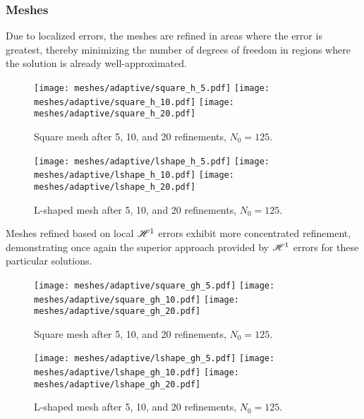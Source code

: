 \newpage
\subsubsection{Meshes}

Due to localized errors, the meshes are refined in areas where the error is greatest, thereby minimizing the number of degrees of freedom in regions where the solution is already well-approximated.

\begin{figure}[!ht]
	\centering
	\texttt{[image: meshes/adaptive/square\_h\_5.pdf]}
	\texttt{[image: meshes/adaptive/square\_h\_10.pdf]}
	\texttt{[image: meshes/adaptive/square\_h\_20.pdf]}
	\caption{Square mesh after 5, 10, and 20 refinements, $N_0 = 125$.}
\end{figure}

\begin{figure}[!ht]
	\centering
	\texttt{[image: meshes/adaptive/lshape\_h\_5.pdf]}
	\texttt{[image: meshes/adaptive/lshape\_h\_10.pdf]}
	\texttt{[image: meshes/adaptive/lshape\_h\_20.pdf]}
	\caption{L-shaped mesh after 5, 10, and 20 refinements, $N_0 = 125$.}
\end{figure}

\newpage

Meshes refined based on local $\mathscr{H}^1$ errors exhibit more concentrated refinement, demonstrating once again the superior approach provided by $\mathscr{H}^1$ errors for these particular solutions.

\begin{figure}[!ht]
	\centering
	\texttt{[image: meshes/adaptive/square\_gh\_5.pdf]}
	\texttt{[image: meshes/adaptive/square\_gh\_10.pdf]}
	\texttt{[image: meshes/adaptive/square\_gh\_20.pdf]}
	\caption{Square mesh after 5, 10, and 20 refinements, $N_0 = 125$.}
\end{figure}

\begin{figure}[!ht]
	\centering
	\texttt{[image: meshes/adaptive/lshape\_gh\_5.pdf]}
	\texttt{[image: meshes/adaptive/lshape\_gh\_10.pdf]}
	\texttt{[image: meshes/adaptive/lshape\_gh\_20.pdf]}
	\caption{L-shaped mesh after 5, 10, and 20 refinements, $N_0 = 125$.}
\end{figure}

